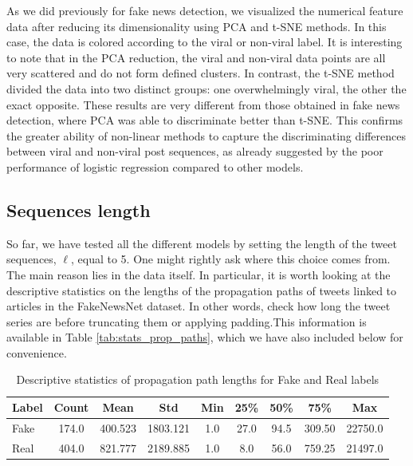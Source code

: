 \documentclass[a4paper,twoside,12pt]{book}
\begin{document}
As we did previously for fake news detection, we visualized the numerical feature data after reducing its dimensionality using PCA and t-SNE methods. In this case, the data is colored according to the viral or non-viral label. It is interesting to note that in the PCA reduction, the viral and non-viral data points are all very scattered and do not form defined clusters. In contrast, the t-SNE method divided the data into two distinct groups: one overwhelmingly viral, the other the exact opposite. These results are very different from those obtained in fake news detection, where PCA was able to discriminate better than t-SNE. This confirms the greater ability of non-linear methods to capture the discriminating differences between viral and non-viral post sequences, as already suggested by the poor performance of logistic regression compared to other models. 

\FloatBarrier

\subsection{Sequences length}

So far, we have tested all the different models by setting the length of the tweet sequences, $\ell$, equal to 5. One might rightly ask where this choice comes from. The main reason lies in the data itself. In particular, it is worth looking at the descriptive statistics on the lengths of the propagation paths of tweets linked to articles in the FakeNewsNet dataset. In other words, check how long the tweet series are before truncating them or applying padding.This information is available in Table \ref{tab:stats_prop_paths}, which we have also included below for convenience. 
\vspace{1em}
\begin{table}[h!]
	\centering
	\begin{tabular}{lcccccccc}
		\toprule
		Label & Count & Mean & Std & Min & 25\% & 50\% & 75\% & Max \\
		\midrule
		Fake & 174.0 & 400.523 & 1803.121 & 1.0 & 27.0 & 94.5 & 309.50 & 22750.0 \\
		Real & 404.0 & 821.777 & 2189.885 & 1.0 & 8.0 & 56.0 & 759.25 & 21497.0 \\
		\bottomrule
	\end{tabular}
	\caption*{Descriptive statistics of propagation path lengths for Fake and Real labels}
\end{table}
\end{document}
